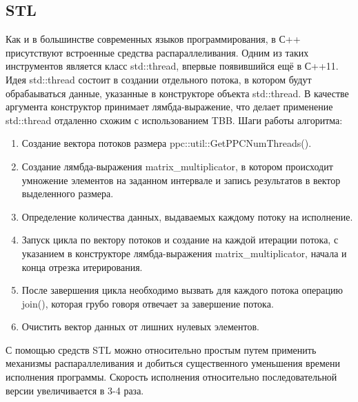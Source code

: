 \documentclass[12pt]{article}
\begin{document}
\subsection*{STL}
Как и в большинстве современных языков программирования, в С++ присутствуют встроенные средства распараллеливания. Одним из таких инструментов является класс std::thread, впервые появившийся ещё в С++11. Идея std::thread состоит в создании отдельного потока, в котором будут обрабаываться данные, указанные в конструкторе объекта std::thread. В качестве аргумента конструктор принимает лямбда-выражение, что делает применение std::thread отдаленно схожим с использованием TBB. Шаги работы алгоритма:
\begin{enumerate}
    \item Создание вектора потоков размера ppc::util::GetPPCNumThreads().
    \item Создание лямбда-выражения matrix\_multiplicator, в котором происходит умножение элементов на заданном интервале и запись результатов в вектор выделенного размера.
    \item Определение количества данных, выдаваемых каждому потоку на исполнение. 
    \item Запуск цикла по вектору потоков и создание на каждой итерации потока, с указанием в конструкторе лямбда-выражения matrix\_multiplicator, начала и конца отрезка итерирования.
    \item После завершения цикла необходимо вызвать для каждого потока операцию join(), которая грубо говоря отвечает за завершение потока. 
    \item Очистить вектор данных от лишних нулевых элементов.
\end{enumerate}
С помощью средств STL можно относительно простым путем применить механизмы распараллеливания и добиться существенного уменьшения времени исполнения программы. Скорость исполнения относительно последовательной версии увеличивается в 3-4 раза.\newpage
\end{document}
